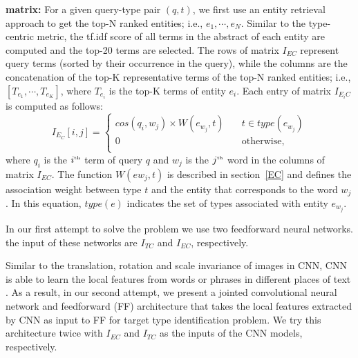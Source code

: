  \textbf{matrix:} For a given query-type pair $(q,t)$, we first use an entity retrieval approach to get the top-N ranked entities; i.e., $e_1,\cdots, e_{N}$. Similar to the type-centric metric, the tf.idf score of all terms in the abstract of each entity are computed and the top-20 terms are selected.  
The rows of matrix $I_{EC}$ represent query terms (sorted by their occurrence in the query), while the columns are the concatenation of the top-K representative terms of the top-N ranked entities; i.e., $[T_{e_1},\cdots, T_{e_{K}}]$, where $T_{e_i}$ is the top-K terms of entity $e_i$. %
Each entry of matrix $I_{E_iC}$ is computed as follows:
\begin{equation}
I_{E_C}[i,j] = 
\begin{cases}
cos(q_i,w_j) \times W(e_{w_j},t) &\quad t \in type(e_{w_j}) \\
0 &\quad\text{otherwise}, \\
\end{cases}
\end{equation}
where $q_i$ is the $i^{\text{\tiny th}}$ term of query $q$ and $w_{j}$ is the $j^{\text{\tiny th}}$ word in the columns of matrix $I_{EC}$. The function $W(e{w_j},t)$ is described in section~\ref{EC} and defines the association weight between type $t$ and the entity that corresponds to the word $w_j$. In this equation, $type(e)$ indicates the set of types associated with entity $e_{w_j}$.


In our first attempt to solve the problem we use two feedforward neural networks. the input of these networks are $I_{TC}$ and $I_{EC}$, respectively.


Similar to the translation, rotation and scale invariance of images in CNN, CNN is able to learn the local features from words or phrases in different places of text \cite{wang2016combination}. As a result, in our second attempt, we present a jointed convolutional neural network and feedforward (FF) architecture that takes the local features extracted by CNN as input to FF for target type identification problem. We try this architecture twice with $I_{EC}$ and $I_{TC}$ as the inputs of the CNN models, respectively.

